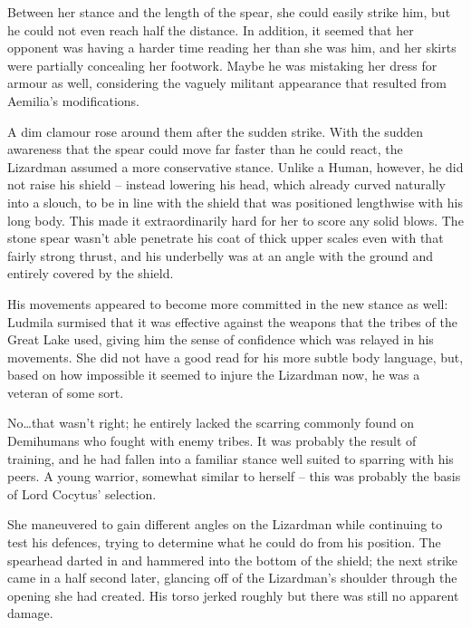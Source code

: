  

Between her stance and the length of the spear, she could easily strike him, but he could not even reach half the distance. In addition, it seemed that her opponent was having a harder time reading her than she was him, and her skirts were partially concealing her footwork. Maybe he was mistaking her dress for armour as well, considering the vaguely militant appearance that resulted from Aemilia’s modifications.

 

A dim clamour rose around them after the sudden strike. With the sudden awareness that the spear could move far faster than he could react, the Lizardman assumed a more conservative stance. Unlike a Human, however, he did not raise his shield – instead lowering his head, which already curved naturally into a slouch, to be in line with the shield that was positioned lengthwise with his long body. This made it extraordinarily hard for her to score any solid blows. The stone spear wasn’t able penetrate his coat of thick upper scales even with that fairly strong thrust, and his underbelly was at an angle with the ground and entirely covered by the shield.

 

His movements appeared to become more committed in the new stance as well: Ludmila surmised that it was effective against the weapons that the tribes of the Great Lake used, giving him the sense of confidence which was relayed in his movements. She did not have a good read for his more subtle body language, but, based on how impossible it seemed to injure the Lizardman now, he was a veteran of some sort.

 

No…that wasn’t right; he entirely lacked the scarring commonly found on Demihumans who fought with enemy tribes. It was probably the result of training, and he had fallen into a familiar stance well suited to sparring with his peers. A young warrior, somewhat similar to herself – this was probably the basis of Lord Cocytus’ selection.

 

She maneuvered to gain different angles on the Lizardman while continuing to test his defences, trying to determine what he could do from his position. The spearhead darted in and hammered into the bottom of the shield; the next strike came in a half second later, glancing off of the Lizardman’s shoulder through the opening she had created. His torso jerked roughly but there was still no apparent damage.


